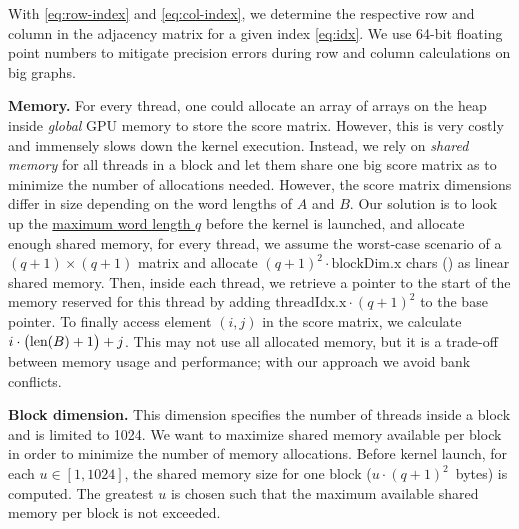 With \eqref{eq:row-index} and \eqref{eq:col-index}, we determine the respective row and column in the adjacency matrix for a given index \eqref{eq:idx}. We use 64-bit floating point numbers to mitigate precision errors during row and column calculations on big graphs.


\textbf{Memory.} For every thread, one could allocate an array of arrays on the heap inside \textit{global} GPU memory to store the score matrix. However, this is very costly and immensely slows down the kernel execution. Instead, we rely on \textit{shared memory} for all threads in a block and let them share one big score matrix as to minimize the number of allocations needed. However, the score matrix dimensions differ in size depending on the word lengths of $A$ and $B$. Our solution is to look up the \underline{maximum word length $q$} before the kernel is launched, and allocate enough shared memory, \ie for every thread, we assume the worst-case scenario of a $(q+1)\times(q+1)$ matrix and allocate $(q+1)^2 \cdot \text{blockDim.x}$ chars () as linear shared memory. Then, inside each thread, we retrieve a pointer to the start of the memory reserved for this thread by adding $\text{threadIdx.x} \cdot (q+1)^2$ to the base pointer. To finally access element $(i,j)$ in the score matrix, we calculate $i\cdot \bigl(\text{len}(B) + 1\bigr) + j$. This may not use all allocated memory, but it is a trade-off between memory usage and performance; with our approach we avoid bank conflicts.


\textbf{Block dimension.} This dimension specifies the number of threads inside a block and is limited to 1024. We want to maximize shared memory available per block in order to minimize the number of memory allocations. Before kernel launch, for each $u\in [1,1024]$, the shared memory size for one block ($u\cdot (q+1)^2$~bytes) is computed. The greatest $u$ is chosen such that the maximum available shared memory per block is not exceeded.